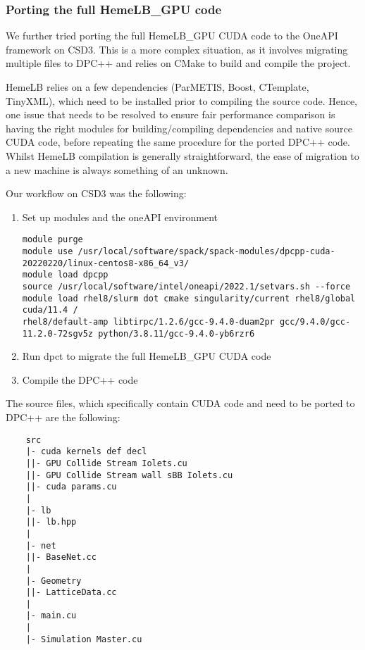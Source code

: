 \documentclass[../main]{subfiles}
\begin{document}
\subsubsection{Porting the full HemeLB\_GPU code}
We further tried porting the full HemeLB\_GPU CUDA code to the OneAPI framework on CSD3. This is a more complex situation, as it involves migrating multiple files to DPC++ and relies on CMake to build and compile the project.    

HemeLB relies on a few dependencies (ParMETIS, Boost, CTemplate, TinyXML), which need to be installed prior to compiling the source code. Hence, one issue that needs to be resolved to ensure fair performance comparison is having the right modules for building/compiling dependencies and native source CUDA code, before repeating the same procedure for the ported DPC++ code. Whilst HemeLB compilation is generally straightforward, the ease of migration to a new machine is always something of an unknown.

Our workflow on CSD3 was the following:
\begin{enumerate}
    \item Set up modules and the oneAPI environment
    \begin{verbatim}
module purge
module use /usr/local/software/spack/spack-modules/dpcpp-cuda-20220220/linux-centos8-x86_64_v3/
module load dpcpp
source /usr/local/software/intel/oneapi/2022.1/setvars.sh --force
module load rhel8/slurm dot cmake singularity/current rhel8/global cuda/11.4 /
rhel8/default-amp libtirpc/1.2.6/gcc-9.4.0-duam2pr gcc/9.4.0/gcc-11.2.0-72sgv5z python/3.8.11/gcc-9.4.0-yb6rzr6
    \end{verbatim}
    \item Run dpct to migrate the full HemeLB\_GPU CUDA code
    \item Compile the DPC++ code 
\end{enumerate}


The source files, which specifically contain CUDA code and need to be ported to DPC++ are the following: 
\begin{verbatim}
    src
    |- cuda kernels def decl
    ||- GPU Collide Stream Iolets.cu
    ||- GPU Collide Stream wall sBB Iolets.cu
    ||- cuda params.cu
    |
    |- lb
    ||- lb.hpp
    |
    |- net
    ||- BaseNet.cc
    |
    |- Geometry
    ||- LatticeData.cc
    |
    |- main.cu
    |
    |- Simulation Master.cu
\end{verbatim}
\end{document}
